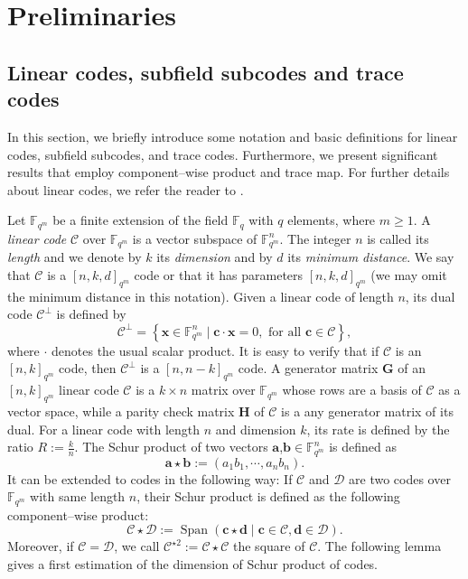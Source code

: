 \documentclass[a4paper]{amsart}
\theoremstyle{definition}
\theoremstyle{remark}
\newcommand{\calC}{\mathcal{C}}
\newcommand{\calD}{\mathcal{D}}
\newcommand{\fqm}{\mathbb{F}_{q^m}}
\newcommand{\fq}{\mathbb{F}_{q}}
\newcommand{\Span}[1]{\operatorname{Span}\left(#1\right)}
\begin{document}
\section{Preliminaries}\label{sec:preli}
\subsection{Linear codes, subfield subcodes and trace codes}

In this section, we briefly introduce some notation and basic definitions for linear codes, subfield subcodes, and trace codes. Furthermore, we present significant results that employ component--wise product and trace map. For further details about linear codes, we refer the reader to \cite{MS86}.

\noindent Let $\fqm$ be a finite extension of the field $\fq$ with $q$ elements, where $m \geq 1$. A \emph{linear code} $\calC$ over $\fqm$ is a vector subspace of $\fqm^n$. The integer $n$ is called its \emph{length} and we denote by $k$ its \emph{dimension} and by $d$ its \emph{minimum distance}. We say that $\calC$ is a $[n,k,d]_{q^m}$ code or that it has parameters $[n,k,d]_{q^m}$ (we may omit the minimum distance in this notation). Given a linear code of length $n$, its dual code $\calC^{\perp}$ is defined by 
\[\calC^{\perp}=\left\lbrace \mathbf{x} \in \fqm^n \mid \mathbf{c} \cdot \mathbf{x}=0, \text{ for all } \mathbf{c} \in \calC \right\rbrace,\]  
where $\cdot$ denotes the usual scalar product. It is easy to verify that if $\calC$ is an $[n,k]_{q^m}$ code, then $\calC^{\perp}$ is a $[n,n-k]_{q^m}$ code.
A generator matrix $\mathbf{G}$ of an $[n,k]_{q^m}$ linear code $\calC$ is a $k \times n$ matrix over $\fqm$ whose rows are a basis of $\calC$ as a vector space, while a parity check matrix $\mathbf{H}$ of $\calC$ is a any generator matrix of its dual.
For a linear code with length $n$ and dimension $k$, its rate is defined by the ratio $R := \frac{k}{n}$.
The Schur product of two vectors $\mathbf{a}$,$\mathbf{b} \in \fqm^n$ is defined as 
\[ \mathbf{a} \star \mathbf{b} := (a_1b_1,\cdots,a_nb_n). \]
It can be extended to codes in the following way: If $\calC$ and $\calD$ are two codes over $\fqm$ with same length $n$, their Schur product is defined as the following component--wise product:
\[ \calC \star \calD := \Span{\mathbf{c} \star \mathbf{d} \mid \mathbf{c} \in \calC, \mathbf{d} \in \calD}. \]
Moreover, if $\calC = \calD$, we call $\calC^{\star 2} := \calC \star \calC$ the square of $\calC$. The following lemma gives a first estimation of the dimension of Schur product of codes.
\end{document}
